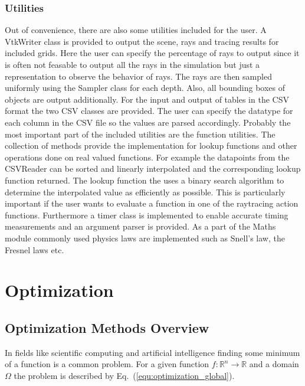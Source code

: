 \documentclass[a4paper,10pt]{article}
\newcommand{\equref}[1]{Eq.~(\ref{#1})}
\begin{document}
    \subsubsection{Utilities} \label{sec:utilities}

    Out of convenience, there are also some utilities included for the user.
    A VtkWriter class is provided to output the scene, rays and tracing results
    for included grids.
    Here the user can specify the percentage of rays to output since
    it is often not feasable to output all the rays in the simulation
    but just a representation to observe the behavior of rays.
    The rays are then sampled uniformly using the Sampler class for each
    depth.
    Also, all bounding boxes of objects are output additionally.
    For the input and output of tables in the CSV format the two CSV classes
    are provided.
    The user can specify the datatype for each column in the CSV file so
    the values are parsed accordingly.
    Probably the most important part of the included utilities are the
    function utilities.
    The collection of methods provide the implementation for lookup
    functions and other operations done on real valued functions.
    For example the datapoints from the CSVReader can be sorted and linearly
    interpolated and the corresponding lookup function returned.
    The lookup function the uses a binary search algorithm to determine
    the interpolated value as efficiently as possible.
    This is particularly important if the user wants to evaluate a function
    in one of the raytracing action functions.
    Furthermore a timer class is implemented to enable accurate timing
    measurements and an argument parser is provided.
    As a part of the Maths module commonly used physics laws are implemented
    such as Snell's law, the Fresnel laws etc.

    \section{Optimization}

    \subsection{Optimization Methods Overview} \label{sec:opt_overview}

    In fields like scientific computing and artificial intelligence
    finding some minimum of a function is a common problem.
    For a given function $f : \mathbb{R}^n \rightarrow \mathbb{R}$ 
    and a domain $\Omega$ the problem is described by 
    \equref{equ:optimization_global}.
\end{document}
